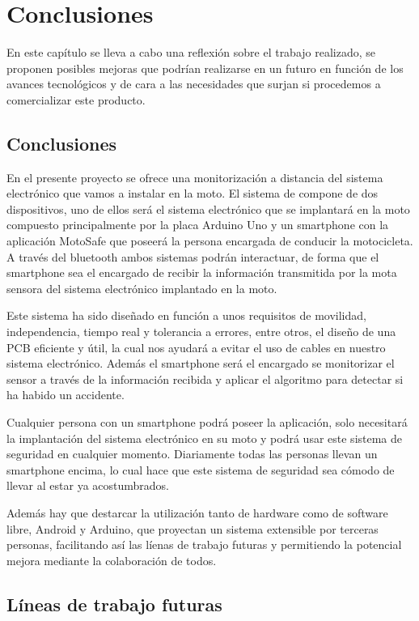	\chapter{Conclusiones}\label{cap.conclusiones}
	
	En este capítulo se lleva a cabo una reflexión sobre el trabajo realizado, se proponen posibles mejoras que podrían realizarse en un futuro en función de los avances tecnológicos y de cara a las necesidades que surjan si procedemos a comercializar este producto.
	
	\section{Conclusiones}
	
		En el presente proyecto se ofrece una monitorización a distancia del sistema electrónico que vamos a instalar en la moto. El sistema de compone de dos dispositivos, uno de ellos será el sistema electrónico que se implantará en la moto compuesto principalmente por la placa Arduino Uno y un smartphone con la aplicación MotoSafe que poseerá la persona encargada de conducir la motocicleta. A través del bluetooth ambos sistemas podrán interactuar, de forma que el smartphone sea el encargado de recibir la información transmitida por la mota sensora del sistema electrónico implantado en la moto.
		
		Este sistema ha sido dise\~nado en función a unos requisitos de movilidad, independencia, tiempo real y tolerancia a errores, entre otros, el dise\~no de una PCB eficiente y útil, la cual nos ayudará a evitar el uso de cables en nuestro sistema electrónico. Además el smartphone será el encargado se monitorizar el sensor a través de la información recibida y aplicar el algoritmo para detectar si ha habido un accidente.
		
		Cualquier persona con un smartphone podrá poseer la aplicación, solo necesitará la implantación del sistema electrónico en su moto y podrá usar este sistema de seguridad en cualquier momento. Diariamente todas las personas llevan un smartphone encima, lo cual hace que este sistema de seguridad sea cómodo de llevar al estar ya acostumbrados.
		
		Además hay que destarcar la utilización tanto de hardware como de software libre, Android y Arduino, que proyectan un sistema extensible por terceras personas, facilitando así las líenas de trabajo futuras y permitiendo la potencial mejora mediante la colaboración de todos.
	
	\section{Líneas de trabajo futuras}
	
